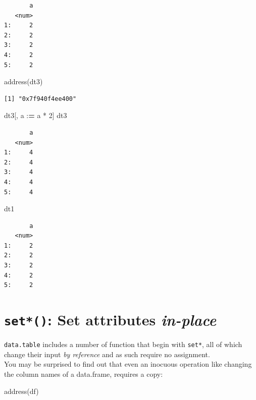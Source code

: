 \documentclass[
]{book}
\newenvironment{Shaded}{\begin{snugshade}}{\end{snugshade}}
\newcommand{\DecValTok}[1]{\textcolor[rgb]{0.00,0.00,0.81}{#1}}
\newcommand{\ErrorTok}[1]{\textcolor[rgb]{0.64,0.00,0.00}{\textbf{#1}}}
\newcommand{\FunctionTok}[1]{\textcolor[rgb]{0.00,0.00,0.00}{#1}}
\newcommand{\NormalTok}[1]{#1}
\newcommand{\SpecialCharTok}[1]{\textcolor[rgb]{0.00,0.00,0.00}{#1}}
\begin{document}
\begin{verbatim}
       a
   <num>
1:     2
2:     2
3:     2
4:     2
5:     2
\end{verbatim}

\begin{Shaded}
\begin{Highlighting}[]
\FunctionTok{address}\NormalTok{(dt3)}
\end{Highlighting}
\end{Shaded}

\begin{verbatim}
[1] "0x7f940f4ee400"
\end{verbatim}

\begin{Shaded}
\begin{Highlighting}[]
\NormalTok{dt3[, a }\SpecialCharTok{:}\ErrorTok{=}\NormalTok{ a }\SpecialCharTok{*} \DecValTok{2}\NormalTok{]}
\NormalTok{dt3}
\end{Highlighting}
\end{Shaded}

\begin{verbatim}
       a
   <num>
1:     4
2:     4
3:     4
4:     4
5:     4
\end{verbatim}

\begin{Shaded}
\begin{Highlighting}[]
\NormalTok{dt1}
\end{Highlighting}
\end{Shaded}

\begin{verbatim}
       a
   <num>
1:     2
2:     2
3:     2
4:     2
5:     2
\end{verbatim}

\hypertarget{set-set-attributes-in-place}{%
\section{\texorpdfstring{\texttt{set*()}: Set attributes \textbf{\emph{in-place}}}{set*(): Set attributes in-place}}\label{set-set-attributes-in-place}}

\texttt{data.table} includes a number of function that begin with \texttt{set*}, all of which change their input \emph{by reference} and as such require no assignment.\\
You may be surprised to find out that even an inocuous operation like changing the column names of a data.frame, requires a copy:

\begin{Shaded}
\begin{Highlighting}[]
\FunctionTok{address}\NormalTok{(df)}
\end{Highlighting}
\end{Shaded}
\end{document}
